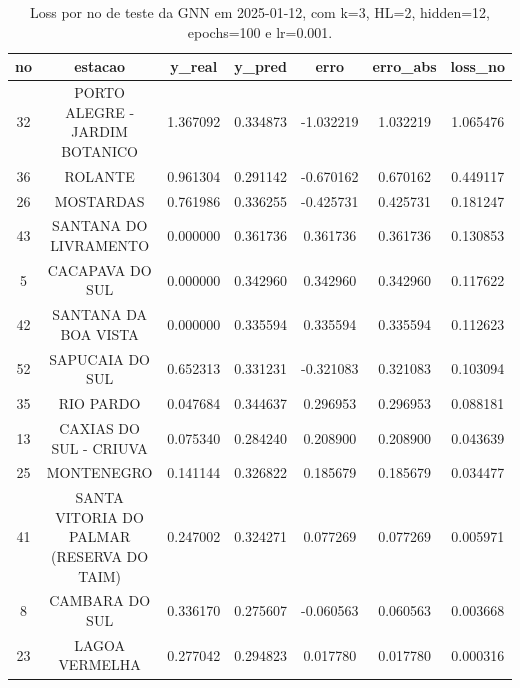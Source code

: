 \begin{table}[h]
\centering
\caption{Loss por no de teste da GNN em 2025-01-12, com k=3, HL=2, hidden=12, epochs=100 e lr=0.001.}
\label{tab:gnn_loss_k3_hl2_h12_e100_d20250112}
\begin{tabular}{ccccccc}
\toprule
no & estacao & y\_real & y\_pred & erro & erro\_abs & loss\_no \\
\midrule
32 & PORTO ALEGRE - JARDIM BOTANICO & 1.367092 & 0.334873 & -1.032219 & 1.032219 & 1.065476 \\
36 & ROLANTE & 0.961304 & 0.291142 & -0.670162 & 0.670162 & 0.449117 \\
26 & MOSTARDAS & 0.761986 & 0.336255 & -0.425731 & 0.425731 & 0.181247 \\
43 & SANTANA DO LIVRAMENTO & 0.000000 & 0.361736 & 0.361736 & 0.361736 & 0.130853 \\
5 & CACAPAVA DO SUL & 0.000000 & 0.342960 & 0.342960 & 0.342960 & 0.117622 \\
42 & SANTANA DA BOA VISTA & 0.000000 & 0.335594 & 0.335594 & 0.335594 & 0.112623 \\
52 & SAPUCAIA DO SUL & 0.652313 & 0.331231 & -0.321083 & 0.321083 & 0.103094 \\
35 & RIO PARDO & 0.047684 & 0.344637 & 0.296953 & 0.296953 & 0.088181 \\
13 & CAXIAS DO SUL - CRIUVA & 0.075340 & 0.284240 & 0.208900 & 0.208900 & 0.043639 \\
25 & MONTENEGRO & 0.141144 & 0.326822 & 0.185679 & 0.185679 & 0.034477 \\
41 & SANTA VITORIA DO PALMAR (RESERVA DO TAIM) & 0.247002 & 0.324271 & 0.077269 & 0.077269 & 0.005971 \\
8 & CAMBARA DO SUL & 0.336170 & 0.275607 & -0.060563 & 0.060563 & 0.003668 \\
23 & LAGOA VERMELHA & 0.277042 & 0.294823 & 0.017780 & 0.017780 & 0.000316 \\
\bottomrule
\end{tabular}
\end{table}
